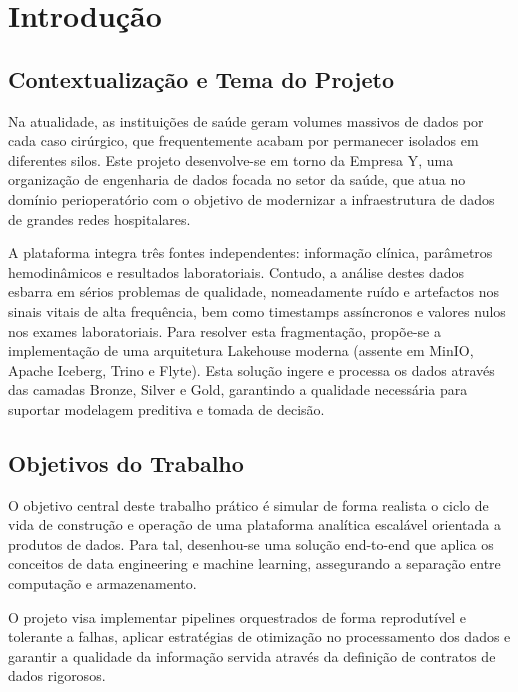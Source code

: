 \section{Introdução} \label{sec:introducao}

\subsection{Contextualização e Tema do Projeto}
Na atualidade, as instituições de saúde geram volumes massivos de dados por cada caso cirúrgico, que frequentemente acabam por permanecer isolados em diferentes silos. Este projeto desenvolve-se em torno da Empresa Y, uma organização de engenharia de dados focada no setor da saúde, que atua no domínio perioperatório com o objetivo de modernizar a infraestrutura de dados de grandes redes hospitalares.

A plataforma integra três fontes independentes: informação clínica, parâmetros hemodinâmicos e resultados laboratoriais. Contudo, a análise destes dados esbarra em sérios problemas de qualidade, nomeadamente ruído e artefactos nos sinais vitais de alta frequência, bem como timestamps assíncronos e valores nulos nos exames laboratoriais. Para resolver esta fragmentação, propõe-se a implementação de uma arquitetura Lakehouse moderna (assente em MinIO, Apache Iceberg, Trino e Flyte). Esta solução ingere e processa os dados através das camadas Bronze, Silver e Gold, garantindo a qualidade necessária para suportar modelagem preditiva e tomada de decisão.

\subsection{Objetivos do Trabalho}
O objetivo central deste trabalho prático é simular de forma realista o ciclo de vida de construção e operação de uma plataforma analítica escalável orientada a produtos de dados. Para tal, desenhou-se uma solução end-to-end que aplica os conceitos de data engineering e machine learning, assegurando a separação entre computação e armazenamento.

O projeto visa implementar pipelines orquestrados de forma reprodutível e tolerante a falhas, aplicar estratégias de otimização no processamento dos dados e garantir a qualidade da informação servida através da definição de contratos de dados rigorosos.

